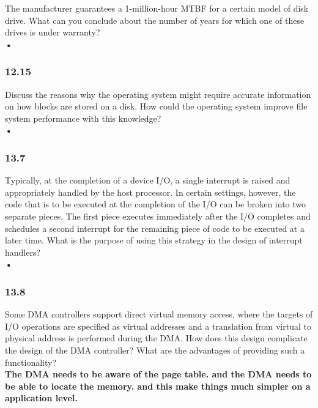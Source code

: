 \documentclass[a4paper,10pt,titlepage]{report}
\begin{document}
\hspace{10mm} 	The manufacturer guarantees a 1-million-hour MTBF for a certain model of disk drive. What can you conclude about the number of years for which one of these drives is under warranty?\\
\hspace{15mm} \textbf{•} \\




\subsubsection{12.15} Discuss the reasons why the operating system might require accurate information on how blocks are stored on a disk. How could the operating system improve file system performance with this knowledge? \\
\hspace{15mm} \textbf{•} \\



\subsubsection{13.7} Typically, at the completion of a device I/O, a single interrupt is raised and appropriately handled by the host processor. In certain settings, however, the code that is to be executed at the completion of the I/O can be broken into two separate pieces. The first piece executes immediately after the I/O completes and schedules a second interrupt for the remaining piece of code to be executed at a later time. What is the purpose of using this strategy in the design of interrupt handlers? \\
\hspace{15mm} \textbf{•} \\





\subsubsection{13.8} Some DMA controllers support direct virtual memory access, where the targets of I/O operations are specified as virtual addresses and a translation from virtual to physical address is performed during the DMA. How does this design complicate the design of the DMA controller? What are the advantages of providing such a functionality?\\
\hspace{15mm} \textbf{ The DMA needs to be aware of the page table. and the DMA needs to be able to locate the memory. and this make things much simpler on a application level.} \\
\end{document}
